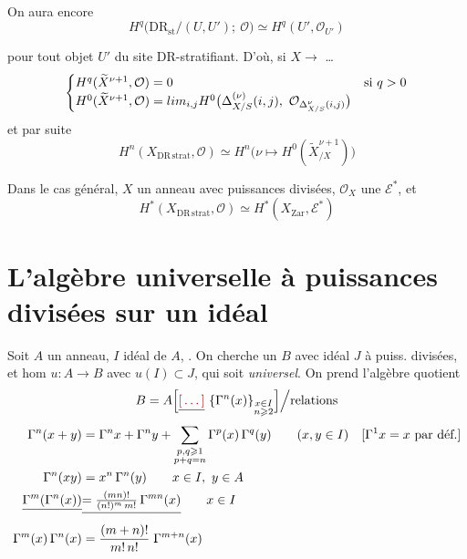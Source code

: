 \documentclass[11pt,a4paper]{article}
\begin{document}
On aura encore
\[
  H^{q}\big(\mathrm{DR}_{\mathrm{st}}/(U, U') ;\ \mathcal{O}\big) \simeq H^{q}(U', \mathcal{O}_{U'})
\]

pour tout objet $U'$ du site $\mathrm{DR}$-stratifiant. D'où, si $X \to$
\ldots
{}
\[
  \begin{cases}
    H^{q}(\widetilde{X}^{\nu+1}, \mathcal{O}) = 0 & \text{si } q > 0 \\
    H^{0}(\widetilde{X}^{\nu+1}, \mathcal{O}) = \varprojlim_{i,j}
      H^{0}\big(\Delta^{(\nu)}_{X/S}(i, j),\ \mathcal{O}_{\Delta^{\nu}_{X/S}(i,j)}\big)
  \end{cases}
\]
et par suite
\[
  H^{n}(X_{\mathrm{DR\,strat}}, \mathcal{O}) \simeq
  H^{n}\big(\nu \mapsto H^{0}(\widetilde{X}^{\nu+1}_{/X})\big)
\]

Dans le cas général, $X$ un anneau avec \ill{} puissances
divisées,  \ill{}  $\mathcal{O}_{X}$ \ill{}
une \ill{} $\mathcal{E}^{*}$, et
\[
  H^{*}(X_{\mathrm{DR\,strat}}, \mathcal{O}) \simeq H^{*}(X_{\mathrm{Zar}}, \mathcal{E}^{*})
\]
\section{L'algèbre universelle à puissances divisées sur un idéal}

Soit $A$ un anneau, $I$ idéal de $A$, . On cherche \struck{\ill{}} un $B$ avec idéal $J$ à puiss.
divisées, et hom $u : A \to B$ avec $u(I) \subset J$, qui soit
\emph{universel}. On prend l'algèbre quotient
\[
  B = A\Big[\struck{\ill{}}\ \{\Gamma^{n}(x)\}_{\substack{x \in I \\ n \geqslant 2}}\Big] \Big/ \text{relations}
\]
\begin{align*}
  \Gamma^{n}(x+y) &= \Gamma^{n}x + \Gamma^{n}y + \sum_{\substack{p, q \geqslant 1 \\ p+q = n}} \Gamma^{p}(x)\,\Gamma^{q}(y) \qquad (x, y \in I)
    \quad [\Gamma^{1}x = x \text{ par déf.}] \\
  \Gamma^{n}(xy) &= x^{n}\,\Gamma^{n}(y) \qquad x \in I,\ y \in A \\
  \struck{\Gamma^{m}(\Gamma^{n}(x))} &\struck{= \tfrac{(mn)!}{(n!)^{m}\, m!}\, \Gamma^{mn}(x)} \qquad x \in I \\
  \Gamma^{m}(x)\,\Gamma^{n}(x) &= \frac{(m+n)!}{m!\, n!}\; \Gamma^{m+n}(x)
\end{align*}
\end{document}
